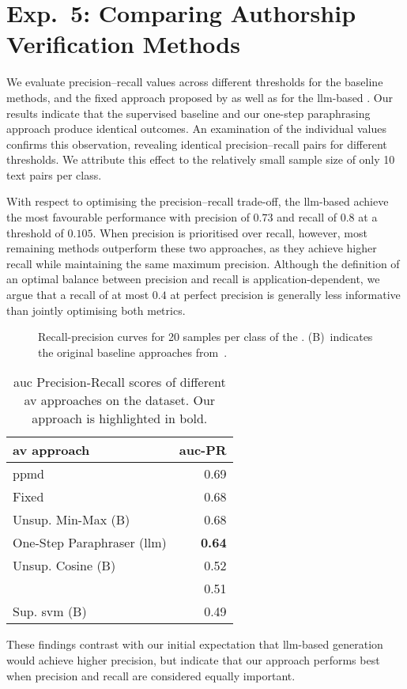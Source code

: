 \section{Exp.\ 5: Comparing Authorship Verification Methods}%
\label{subsec:imp_gen_res}

We evaluate precision–recall values across different thresholds for the baseline methods, and the fixed approach proposed by \citet{koppel_determining_2014} as well as for the \ac{llm}-based \impAppr{}.
Our results indicate that the supervised baseline and our one-step paraphrasing approach produce identical outcomes.
An examination of the individual values confirms this observation, revealing identical precision–recall pairs for different thresholds.
We attribute this effect to the relatively small sample size of only 10 text pairs per class.

With respect to optimising the precision–recall trade-off, the \ac{llm}-based \impAppr{} achieve the most favourable performance with precision of $0.73$ and recall of $0.8$ at a threshold of $0.105$.
When precision is prioritised over recall, however, most remaining methods outperform these two approaches, as they achieve higher recall while maintaining the same maximum precision.
Although the definition of an optimal balance between precision and recall is application-dependent, we argue that a recall of at most $0.4$ at perfect precision is generally less informative than jointly optimising both metrics.

\begin{figure}[htbp]
    \centering
    
    \caption[Recall-precision curves for the \dataStudent{}]{Recall-precision curves for 20 samples per class of the \dataStudent{}. 
    (B)~indicates the original baseline approaches from~\citep{koppel_determining_2014}.
    }
    \label{fig:comp_naive_student}
\end{figure}

\begin{table}[h]
\centering
\label{tab:auc_pr}
\caption[\ac{auc} Precision-Recall results]{\ac{auc} Precision-Recall scores of different \ac{av} approaches on the \dataStudent{} dataset. 
Our approach is highlighted in bold.
}
\begin{tabular}{lr}
\toprule
\ac{av} approach           & \ac{auc}-PR \\
\midrule
\acs{ppmd}                       & 0.69   \\
Fixed                      & 0.68   \\
Unsup. Min-Max (B)         & 0.68   \\
One-Step Paraphraser (\ac{llm}) & \textbf{0.64}   \\
Unsup. Cosine (B)          & 0.52   \\
\unmasking{}                  & 0.51   \\
Sup. \ac{svm} (B)               & 0.49  \\
\bottomrule
\end{tabular}%
\end{table}

These findings contrast with our initial expectation that \ac{llm}-based \imp{} generation would achieve higher precision, but indicate that our approach performs best when precision and recall are considered equally important.

